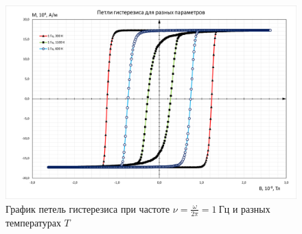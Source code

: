 \documentclass[oneside,final,14pt]{extarticle}
\begin{document}
	\begin{figure}[h]
		\centering
		\includegraphics[scale=0.6]{fig1orig.png}
		\caption{График петель гистерезиса при частоте $\nu=\frac{\omega}{2\pi}=1 \ \text{Гц}$ и разных температурах $T$}
		\label{ris:hyst1}
	\end{figure}
\end{document}
